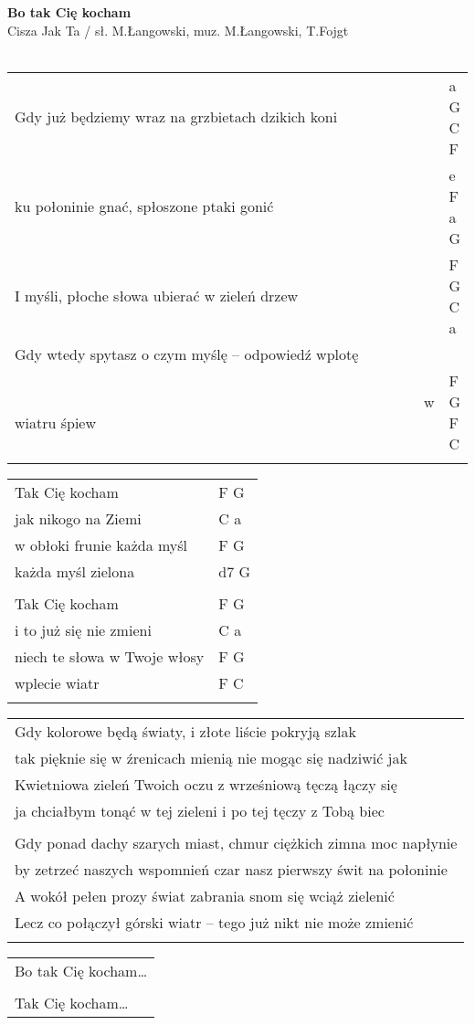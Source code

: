\documentclass[a5paper]{article}
\begin{document}


\noindent
\fontsize{12pt}{15pt}\selectfont
\textbf{Bo tak Cię kocham} \\
\fontsize{8pt}{10pt}\selectfont
Cisza Jak Ta / sł. M.Łangowski, muz. M.Łangowski, T.Fojgt \\ \\
\fontsize{10pt}{12pt}\selectfont
{}
\begin{tabular}{@{}p{9cm}p{2cm}@{}}
\noindent
Gdy już będziemy wraz na grzbietach dzikich koni & a G C F \\
ku połoninie gnać, spłoszone ptaki gonić & e F a G \\
I myśli, płoche słowa ubierać w zieleń drzew & F G C a \\
Gdy wtedy spytasz o czym myślę – odpowiedź wplotę & \\
~~~~~~~~~~~~~~~~~~~~~~~~~~~~~~~~~~~~~~~~~~~~~~~~~~~~~~~~w wiatru śpiew & F G F C \\ \\
\end{tabular}

\noindent
\begin{tabular}{@{}p{8cm}p{2cm}@{}}
Tak Cię kocham & F G \\
jak nikogo na Ziemi & C a \\
w obłoki frunie każda myśl & F G \\
każda myśl zielona & d7 G \\ \\

Tak Cię kocham & F G \\
i to już się nie zmieni & C a \\
niech te słowa w Twoje włosy & F G \\
wplecie wiatr & F C \\ \\
\end{tabular}

\noindent
\begin{tabular}{@{}p{10.5cm}@{}}
Gdy kolorowe będą światy, i złote liście pokryją szlak \\
tak pięknie się w źrenicach mienią nie mogąc się nadziwić jak \\
Kwietniowa zieleń Twoich oczu z wrześniową tęczą łączy się \\
ja chciałbym tonąć w tej zieleni i po tej tęczy z Tobą biec \\ \\

Gdy ponad dachy szarych miast, chmur ciężkich zimna moc napłynie \\
by zetrzeć naszych wspomnień czar nasz pierwszy świt na połoninie \\
A wokół pełen prozy świat zabrania snom się wciąż zielenić \\
Lecz co połączył górski wiatr – tego już nikt nie może zmienić \\ \\
\end{tabular}

\noindent
\begin{tabular}{@{}p{8.5cm}@{}}
Bo tak Cię kocham… \\ \\
Tak Cię kocham…
\end{tabular}
\end{document}
